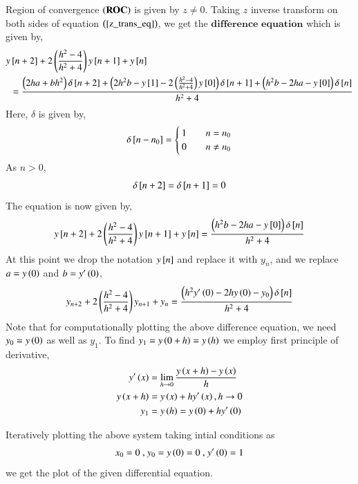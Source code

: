 \documentclass[journal]{IEEEtran}
\begin{document}
Region of convergence $\left(\textbf{ROC}\right)$ is given by $z \neq 0$.
\newline
Taking $z$ inverse transform on both sides of equation $\left(\ref{z_trans_eq}\right)$, we get the $\textbf{difference equation}$ which is given by,
\begin{align}
    y&{}\left[n + 2\right] + 2\left(\frac{h^2 - 4}{h^2 + 4}\right) y{}\left[n + 1\right] + y{}\left[n\right] \nonumber\\
    &= \frac{\left(2h a + b h^2\right)\delta{}\left[n + 2\right] + \left(2h^2 b - y{}\left[1\right] - 2\left(\frac{h^2 - 4}{h^2 + 4}\right)y{}\left[0\right]\right)\delta{}\left[n + 1\right] + \left(h^2b - 2ha - y{}\left[0\right]\right)\delta{}\left[n\right]}{h^2 + 4} \label{diff_eq}
\end{align}
Here, $\delta$ is given by,
\begin{align}
    \delta{}\left[n - n_0\right] =
    \begin{cases}
        1 & \quad n = n_0\\
        0 & \quad n \neq n_0
    \end{cases}
\end{align}
As $n > 0$, 
\begin{align}
    \delta{}\left[n + 2\right] = \delta{}\left[n + 1\right] = 0
\end{align}
The equation \brak{\ref{diff_eq}} is now given by,
\begin{align}
    y{}\left[n + 2\right] + 2\left(\frac{h^2 - 4}{h^2 + 4}\right) y{}\left[n + 1\right] + y{}\left[n\right] = \frac{\left(h^2b - 2ha - y{}\left[0\right]\right)\delta{}\left[n\right]}{h^2 + 4} 
\end{align}
At this point we drop the notation $y{}\left[n\right]$ and replace it with $y_n$, and we replace $a = y\left(0\right)$ and $b = y^{\prime}\left(0\right)$,
\begin{align}
    y_{n + 2} + 2\left(\frac{h^2 - 4}{h^2 + 4}\right) y_{n + 1} + y_{n} = \frac{\left(h^2y^{\prime}\left(0\right) - 2hy\left(0\right) - y_0\right)\delta{}\left[n\right]}{h^2 + 4} 
\end{align}
Note that for computationally plotting the above difference equation, we need $y_0 = y\left(0\right)$ as well as $y_1$. To find $y_1 = y\left(0 + h\right) = y\left(h\right)$ we employ first principle of derivative,
\begin{align}
    y^{\prime}\left(x\right) &= \lim_{h\to0} \frac{y\left(x + h\right) - y\left(x\right)}{h}\\
    y\left(x + h\right) &= y\left(x\right) + hy^{\prime}\left(x\right), h\to0\\
    y_1 &= y\left(h\right) = y\left(0\right) + hy^{\prime}\left(0\right)
\end{align}

Iteratively plotting the above system taking intial conditions as 
\begin{align}
    x_0 = 0 \text{ , } y_{0} = y\left(0\right) = 0 \text{ , } y^{\prime}\left(0\right) = 1
\end{align}
we get the plot of the given differential equation.
\end{document}
